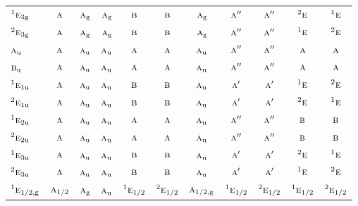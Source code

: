 \documentclass[10pt,a4paper]{article}
\numberwithin{equation}{section}
\newcommand{\irr}[1]{\text{\normalfont\scshape #1}}
\newcommand{\conjpair}[1]{{}^{#1}}
\newcommand{\ptag}[1]{\mathrm{#1}}
\begin{document}
{\begin{longtable}{@{}lcccccccccc@{}}
$\conjpair{1}\irr{e}_{3\ptag{g}}$ & $\irr{a}$ & $\irr{a}_{\ptag{g}}$ & $\irr{a}_{\ptag{g}}$ & $\irr{b}$ & $\irr{b}$ & $\irr{a}_{\ptag{g}}$ & $\irr{a}''$ & $\irr{a}''$ & $\conjpair{2}\irr{e}$ & $\conjpair{1}\irr{e}$\\
$\conjpair{2}\irr{e}_{3\ptag{g}}$ & $\irr{a}$ & $\irr{a}_{\ptag{g}}$ & $\irr{a}_{\ptag{g}}$ & $\irr{b}$ & $\irr{b}$ & $\irr{a}_{\ptag{g}}$ & $\irr{a}''$ & $\irr{a}''$ & $\conjpair{1}\irr{e}$ & $\conjpair{2}\irr{e}$\\
$\irr{a}_{\ptag{u}}$ & $\irr{a}$ & $\irr{a}_{\ptag{u}}$ & $\irr{a}_{\ptag{u}}$ & $\irr{a}$ & $\irr{a}$ & $\irr{a}_{\ptag{u}}$ & $\irr{a}''$ & $\irr{a}''$ & $\irr{a}$ & $\irr{a}$\\
$\irr{b}_{\ptag{u}}$ & $\irr{a}$ & $\irr{a}_{\ptag{u}}$ & $\irr{a}_{\ptag{u}}$ & $\irr{a}$ & $\irr{a}$ & $\irr{a}_{\ptag{u}}$ & $\irr{a}''$ & $\irr{a}''$ & $\irr{a}$ & $\irr{a}$\\
$\conjpair{1}\irr{e}_{1\ptag{u}}$ & $\irr{a}$ & $\irr{a}_{\ptag{u}}$ & $\irr{a}_{\ptag{u}}$ & $\irr{b}$ & $\irr{b}$ & $\irr{a}_{\ptag{u}}$ & $\irr{a}'$ & $\irr{a}'$ & $\conjpair{1}\irr{e}$ & $\conjpair{2}\irr{e}$\\
$\conjpair{2}\irr{e}_{1\ptag{u}}$ & $\irr{a}$ & $\irr{a}_{\ptag{u}}$ & $\irr{a}_{\ptag{u}}$ & $\irr{b}$ & $\irr{b}$ & $\irr{a}_{\ptag{u}}$ & $\irr{a}'$ & $\irr{a}'$ & $\conjpair{2}\irr{e}$ & $\conjpair{1}\irr{e}$\\
$\conjpair{1}\irr{e}_{2\ptag{u}}$ & $\irr{a}$ & $\irr{a}_{\ptag{u}}$ & $\irr{a}_{\ptag{u}}$ & $\irr{a}$ & $\irr{a}$ & $\irr{a}_{\ptag{u}}$ & $\irr{a}''$ & $\irr{a}''$ & $\irr{b}$ & $\irr{b}$\\
$\conjpair{2}\irr{e}_{2\ptag{u}}$ & $\irr{a}$ & $\irr{a}_{\ptag{u}}$ & $\irr{a}_{\ptag{u}}$ & $\irr{a}$ & $\irr{a}$ & $\irr{a}_{\ptag{u}}$ & $\irr{a}''$ & $\irr{a}''$ & $\irr{b}$ & $\irr{b}$\\
$\conjpair{1}\irr{e}_{3\ptag{u}}$ & $\irr{a}$ & $\irr{a}_{\ptag{u}}$ & $\irr{a}_{\ptag{u}}$ & $\irr{b}$ & $\irr{b}$ & $\irr{a}_{\ptag{u}}$ & $\irr{a}'$ & $\irr{a}'$ & $\conjpair{2}\irr{e}$ & $\conjpair{1}\irr{e}$\\
$\conjpair{2}\irr{e}_{3\ptag{u}}$ & $\irr{a}$ & $\irr{a}_{\ptag{u}}$ & $\irr{a}_{\ptag{u}}$ & $\irr{b}$ & $\irr{b}$ & $\irr{a}_{\ptag{u}}$ & $\irr{a}'$ & $\irr{a}'$ & $\conjpair{1}\irr{e}$ & $\conjpair{2}\irr{e}$\\
$\conjpair{1}\irr{e}_{1/2,\ptag{g}}$ & $\irr{a}_{1/2}$ & $\irr{a}_{\ptag{g}}$ & $\irr{a}_{\ptag{u}}$ & $\conjpair{1}\irr{e}_{1/2}$ & $\conjpair{2}\irr{e}_{1/2}$ & $\irr{a}_{1/2,\ptag{g}}$ & $\conjpair{1}\irr{e}_{1/2}$ & $\conjpair{2}\irr{e}_{1/2}$ & $\conjpair{1}\irr{e}_{1/2}$ & $\conjpair{2}\irr{e}_{1/2}$\\

\end{longtable}}
\end{document}
